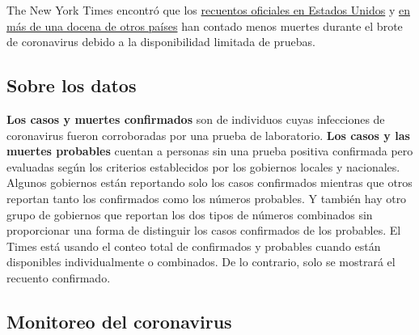 The New York Times encontró que los
\href{https://www.nytimes.com/interactive/2020/04/28/us/coronavirus-death-toll-total.html}{recuentos
oficiales en Estados Unidos} y
\href{https://www.nytimes.com/interactive/2020/04/21/world/coronavirus-missing-deaths.html}{en
más de una docena de otros países} han contado menos muertes durante el
brote de coronavirus debido a la disponibilidad limitada de pruebas.

\hypertarget{sobre-los-datos}{%
\subsection{Sobre los datos}\label{sobre-los-datos}}

\textbf{Los casos y muertes confirmados} son de individuos cuyas
infecciones de coronavirus fueron corroboradas por una prueba de
laboratorio. \textbf{Los casos y las muertes probables} cuentan a
personas sin una prueba positiva confirmada pero evaluadas según los
criterios establecidos por los gobiernos locales y nacionales. Algunos
gobiernos están reportando solo los casos confirmados mientras que otros
reportan tanto los confirmados como los números probables. Y también hay
otro grupo de gobiernos que reportan los dos tipos de números combinados
sin proporcionar una forma de distinguir los casos confirmados de los
probables. El Times está usando el conteo total de confirmados y
probables cuando están disponibles individualmente o combinados. De lo
contrario, solo se mostrará el recuento confirmado.

\hypertarget{monitoreo-del-coronavirus}{%
\subsection{Monitoreo del coronavirus}\label{monitoreo-del-coronavirus}}

